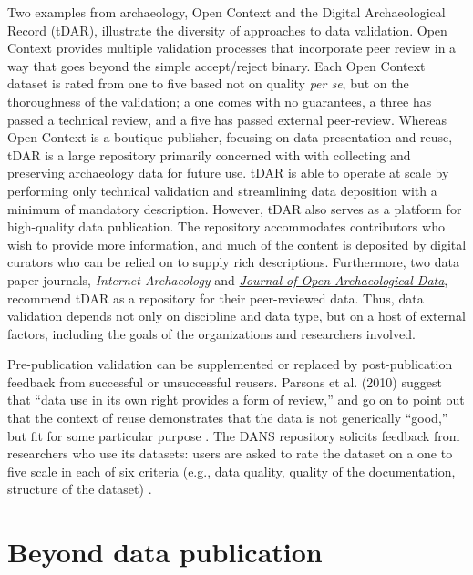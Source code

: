 \documentclass[10pt,a4paper,twocolumn]{article}
\begin{document}
{Two examples from archaeology, Open Context and the Digital Archaeological Record (tDAR), illustrate the diversity of approaches to data validation.
Open Context provides multiple validation processes that incorporate peer review in a way that goes beyond the simple accept/reject binary\cite{kansa_we_2013}.
Each Open Context dataset is rated from one to five based not on quality \emph{per se}, but on the thoroughness of the validation; a one comes with no guarantees, a three has passed a technical review, and a five has passed external peer-review.
Whereas Open Context is a boutique publisher, focusing on data presentation and reuse, tDAR is a large repository primarily concerned with with collecting and preserving archaeology data for future use.
tDAR is able to operate at scale by performing only technical validation and streamlining data deposition with a minimum of mandatory description.
However, tDAR also serves as a platform for high-quality data publication.
The repository accommodates contributors who wish to provide more information, and much of the content is deposited by digital curators who can be relied on to supply rich descriptions.
Furthermore, two data paper journals, \emph{Internet Archaeology} and \href{http://openarchaeologydata.metajnl.com/}{\emph{Journal of Open Archaeological Data}}, recommend tDAR as a repository for their peer-reviewed data.
Thus, data validation depends not only on discipline and data type, but on a host of external factors, including the goals of the organizations and researchers involved.

Pre-publication validation can be supplemented or replaced by post-publication feedback from successful or unsuccessful reusers.
Parsons et al. (2010) suggest that ``data use in its own right provides a form of review,'' and go on to point out that the context of reuse demonstrates that the data is not generically ``good,'' but fit for some particular purpose \cite{parsons_data_2010}.
The DANS repository solicits feedback from researchers who use its datasets: users are asked to rate the dataset on a one to five scale in each of six criteria (e.g., data quality, quality of the documentation, structure of the dataset) \cite{grootveld_data_2011,grootveld_peer-reviewed_2012}.


\section*{Beyond data publication}\label{beyond-data-publication}

}
\end{document}
